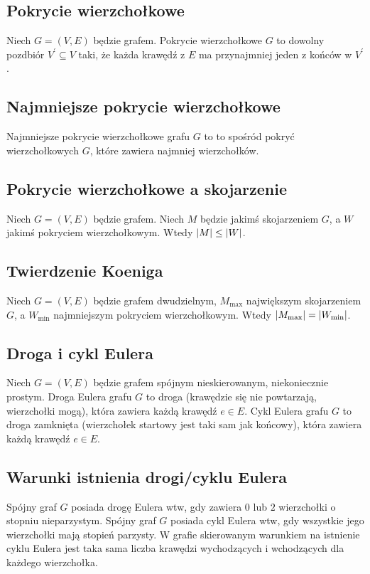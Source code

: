 \subsection*{Pokrycie wierzchołkowe}
Niech $G = (V, E)$ będzie grafem. Pokrycie wierzchołkowe $G$ to dowolny
pozdbiór $V^\prime \subseteq V$ taki, że każda krawędź z $E$ ma przynajmniej
jeden z końców w $V^\prime$.

\subsection*{Najmniejsze pokrycie wierzchołkowe}
Najmniejsze pokrycie wierzchołkowe grafu $G$ to to spośród pokryć
wierzchołkowych $G$, które zawiera najmniej wierzchołków.

\subsection*{Pokrycie wierzchołkowe a skojarzenie}
Niech $G = (V, E)$ będzie grafem. Niech $M$ będzie jakimś skojarzeniem $G$, 
a $W$ jakimś pokryciem wierzchołkowym. Wtedy $\left| M \right| \leq \left| W \right|$.

\subsection*{Twierdzenie Koeniga}
Niech $G = (V, E)$ będzie grafem dwudzielnym, $M_{\max}$ największym skojarzeniem
$G$, a $W_{\min}$ najmniejszym pokryciem wierzchołkowym. Wtedy 
$\left| M_{\max} \right| = \left| W_{\min} \right|$.

\subsection*{Droga i cykl Eulera}
Niech $G = (V, E)$ będzie grafem spójnym nieskierowanym, niekoniecznie prostym.
Droga Eulera grafu $G$ to droga (krawędzie się nie powtarzają, wierzchołki mogą),
która zawiera każdą krawędź $e \in E$. Cykl Eulera grafu $G$ to droga zamknięta
(wierzchołek startowy jest taki sam jak końcowy), która zawiera każdą krawędź 
$e \in E$.

\subsection*{Warunki istnienia drogi/cyklu Eulera}
Spójny graf $G$ posiada drogę Eulera wtw, gdy zawiera $0$ lub $2$ wierzchołki
o stopniu nieparzystym. Spójny graf $G$ posiada cykl Eulera wtw, gdy wszystkie
jego wierzchołki mają stopień parzysty. W grafie skierowanym warunkiem na istnienie
cyklu Eulera jest taka sama liczba krawędzi wychodzących i wchodzących dla każdego
wierzchołka. \\

